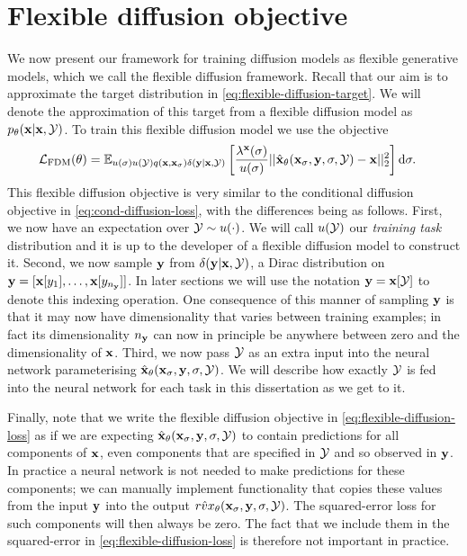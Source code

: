 \section{Flexible diffusion objective}

We now present our framework for training diffusion models as flexible generative models, which we call the flexible diffusion framework. Recall that our aim is to approximate the target distribution in \cref{eq:flexible-diffusion-target}. We will denote the approximation of this target from a flexible diffusion model as $p_\theta({\mathbf{x}}|{\mathbf{x}},{\mathcal{Y}})$. To train this flexible diffusion model we use the objective
\begin{align} \label{eq:flexible-diffusion-loss}
    \mathcal{L}_\text{FDM}(\theta) &= \mathbb{E}_{u(\sigma)u({\mathcal{Y}})q({\mathbf{x}}, {\mathbf{x}}_\sigma)\delta({\mathbf{y}}|{\mathbf{x}},{\mathcal{Y}})} \left[ 
    \frac{\lambda^{\mathbf{x}}(\sigma)}{u(\sigma)} || \hat{{\mathbf{x}}}_\theta({\mathbf{x}}_\sigma, {\mathbf{y}}, \sigma, {\mathcal{Y}}) - {\mathbf{x}} ||_2^2 \right] \mathrm{d}\sigma.
\end{align}
This flexible diffusion objective is very similar to the conditional diffusion objective in \cref{eq:cond-diffusion-loss}, with the differences being as follows. First, we now have an expectation over ${\mathcal{Y}} \sim u(\cdot)$. We will call $u({\mathcal{Y}})$ our \textit{training task} distribution and it is up to the developer of a flexible diffusion model to construct it. Second, we now sample ${\mathbf{y}}$ from $\delta({\mathbf{y}}|{\mathbf{x}},{\mathcal{Y}})$, a Dirac distribution on ${\mathbf{y}} = [ {\mathbf{x}}[y_1], \ldots, {\mathbf{x}}[y_{n_{\mathbf{y}}}] ]$. In later sections we will use the notation ${\mathbf{y}} = {\mathbf{x}}[{\mathcal{Y}}]$ to denote this indexing operation. One consequence of this manner of sampling ${\mathbf{y}}$ is that it may now have dimensionality that varies between training examples; in fact its dimensionality $n_{\mathbf{y}}$ can now in principle be anywhere between zero and the dimensionality of ${\mathbf{x}}$. Third, we now pass ${\mathcal{Y}}$ as an extra input into the neural network parameterising $\hat{{\mathbf{x}}}_\theta({\mathbf{x}}_\sigma, {\mathbf{y}}, \sigma, {\mathcal{Y}})$. We will describe how exactly ${\mathcal{Y}}$ is fed into the neural network for each task in this dissertation as we get to it.

Finally, note that we write the flexible diffusion objective in  \cref{eq:flexible-diffusion-loss} as if we are expecting $\hat{{\mathbf{x}}}_\theta({\mathbf{x}}_\sigma, {\mathbf{y}}, \sigma, {\mathcal{Y}})$ to contain predictions for all components of ${\mathbf{x}}$, even components that are specified in ${\mathcal{Y}}$ and so observed in ${\mathbf{y}}$. In practice a neural network is not needed to make predictions for these components; we can manually implement functionality that copies these values from the input ${\mathbf{y}}$ into the output $\hat{rvx}_\theta({\mathbf{x}}_\sigma, {\mathbf{y}}, \sigma, {\mathcal{Y}})$. The squared-error loss for such components will then always be zero. The fact that we include them in the squared-error in \cref{eq:flexible-diffusion-loss} is therefore not important in practice.

